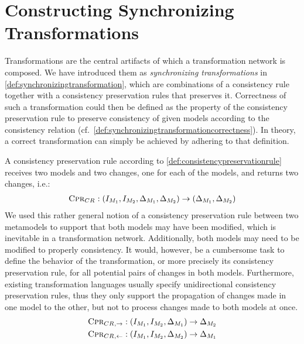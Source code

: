 \chapter{Constructing Synchronizing Transformations
}
\label{chap:synchronization}



Transformations are the central artifacts of which a transformation network is composed.
We have introduced them as \emph{synchronizing transformations} in \autoref{def:synchronizingtransformation}, which are combinations of a consistency rule together with a consistency preservation rules that preserves it.
Correctness of such a transformation could then be defined as the property of the consistency preservation rule to preserve consistency of given models according to the consistency relation (cf.\ \autoref{def:synchronizingtransformationcorrectness}).
In theory, a correct transformation can simply be achieved by adhering to that definition.

A consistency preservation rule according to \autoref{def:consistencypreservationrule} receives two models and two changes, one for each of the models, and returns two changes, i.e.:
\begin{align*}
    \textsc{Cpr}_{CR_{}} : (I_{M_{1}}, I_{M_{2}}, \Delta_{M_{1}}, \Delta_{M_{2}}) \rightarrow (\Delta_{M_{1}}, \Delta_{M_{2}})
\end{align*}
We used this rather general notion of a consistency preservation rule between two metamodels to support that both models may have been modified, which is inevitable in a transformation network.
Additionally, both models may need to be modified to properly consistency.
It would, however, be a cumbersome task to define the behavior of the transformation, or more precisely its consistency preservation rule, for all potential pairs of changes in both models.
Furthermore, existing transformation languages usually specify unidirectional consistency preservation rules, thus they only support the propagation of changes made in one model to the other, but not to process changes made to both models at once.
\begin{align*}
    \textsc{Cpr}_{CR_{},\rightarrow} : (I_{M_{1}}, I_{M_{2}}, \Delta_{M_{1}}) \rightarrow \Delta_{M_{2}}\\
    \textsc{Cpr}_{CR_{},\leftarrow} : (I_{M_{1}}, I_{M_{2}}, \Delta_{M_{2}}) \rightarrow \Delta_{M_{1}}
\end{align*}

